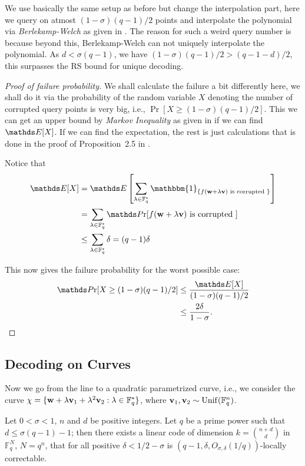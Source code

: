 We use basically the same setup as before but change the interpolation part, here we query on atmost $(1-\sigma)(q-1)/2$ points and interpolate the polynomial via \emph{Berlekamp-Welch} as given in \cite{GRS25}. The reason for such a weird query number is because beyond this, Berlekamp-Welch can not uniquely interpolate the polynomial. As $d<\sigma(q-1)$, we have $(1-\sigma)(q-1)/2>(q-1-d)/2$, this surpasses the RS bound for unique decoding. 
\begin{proof}[Proof of failure probability]
		We shall calculate the failure a bit differently here, we shall do it via the probability of the random variable $X$ denoting the number of corrupted query points is very big, i.e., $\Pr[X\geq (1-\sigma)(q-1)/2]$. This we can get an upper bound by \emph{Markov Inequality} as given in \cite{Alon2000} if we can find $\E[X]$. If we can find the expectation, the rest is just calculations that is done in the proof of Proposition~2.5 in \cite{Yek12}.
		
		Notice that 
		\begin{align}
			\E[X] 
			& = \E\left[ \sum_{\lambda\in\bbf_q^*} \mathbbm{1}_{\{f(\bfw + \lambda\bfv) \text{ is corrupted }\}} \right]\label{rv define} \\[0.1em]
			& = \sum_{\lambda\in\bbf_q^*}\Pr[f(\bfw+\lambda\bfv) \text{ is corrupted }]\nonumber \\
			& \leq \sum_{\lambda\in\bbf_q^*} \delta = (q-1)\delta \nonumber
		\end{align}
		
		This now gives the failure probability for the worst possible case:
		\begin{align*}
			\Pr[X\geq(1-\sigma)(q-1)/2]
			& \leq \frac{\E[X]}{(1-\sigma)(q-1)/2} \\
			& \leq \frac{2\delta}{1 - \sigma}.
		\end{align*}
\end{proof}

\subsection{Decoding on Curves}
Now we go from the line to a quadratic parametrized curve, i.e., we consider the curve $\chi = \{\mathbf{w} + \lambda\mathbf{v}_1 + \lambda^2\mathbf{v}_2 : \lambda \in \mathbb{F}_q^*\}$, where $\mathbf{v}_1, \mathbf{v}_2 \sim \mathrm{Unif}(\mathbb{F}_{q}^n)$. 
\begin{greybox}
		\begin{proposition}{}{}
			Let $0<\sigma < 1$, $n$ and $d$ be positive integers. Let $q$ be a prime power such that $d \leq \sigma(q-1) - 1$; then there exists a linear code of dimension $k = \binom{n+d}{d}$ in $\mathbb{F}_q^N$, $N = q^n$, that for all positive $\delta < 1/2 - \sigma$ is $(q-1, \delta, O_{\sigma, \delta}(1/q))$-locally correctable.
		\end{proposition}
\end{greybox}

